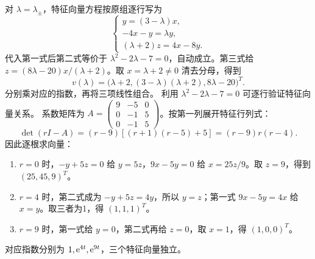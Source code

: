 对 $\lambda=\lambda_\pm$，特征向量方程按原组逐行写为
\[
\begin{cases}
y=(3-\lambda)x,\\
-4x-y=\lambda y,\\
(\lambda+2)z=4x-8y.
\end{cases}
\]
代入第一式后第二式等价于 $\lambda^2-2\lambda-7=0$，自动成立。第三式给 $z=(8\lambda-20)x/(\lambda+2)$。取 $x=\lambda+2\ne0$ 清去分母，得到
\[
v(\lambda)=\bigl(\lambda+2,(3-\lambda)(\lambda+2),8\lambda-20\bigr)^T.
\]
分别乘对应的指数，再将三项线性组合。
利用 $\lambda^2-2\lambda-7=0$ 可逐行验证特征向量关系。
系数矩阵为 $A=\begin{pmatrix}9&-5&0\\0&-1&5\\0&-1&5\end{pmatrix}$。按第一列展开特征行列式：
\[
\det(rI-A)=(r-9)[(r+1)(r-5)+5]=(r-9)r(r-4).
\]
因此逐根求向量：
\begin{enumerate}
\item $r=0$ 时，$-y+5z=0$ 给 $y=5z$，$9x-5y=0$ 给 $x=25z/9$。取 $z=9$，得到 $(25,45,9)^T$。
\item $r=4$ 时，第二式成为 $-y+5z=4y$，所以 $y=z$；第一式 $9x-5y=4x$ 给 $x=y$。取三者为1，得 $(1,1,1)^T$。
\item $r=9$ 时，第一式给 $y=0$，第二式再给 $z=0$，取 $x=1$，得 $(1,0,0)^T$。
\end{enumerate}
对应指数分别为 $1,\mathrm e^{4t},\mathrm e^{9t}$，三个特征向量独立。
